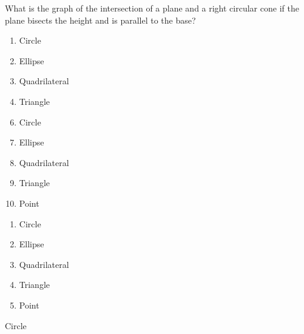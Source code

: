 





  What is the graph of the intersection of a plane and a right circular cone if the plane bisects the height and is parallel to the base? 


\ifsat
	\begin{enumerate}[label=\Alph*)]
		\item   Circle %
		\item  Ellipse
		\item  Quadrilateral 
		\item  Triangle
	\end{enumerate}
\else
\fi

\ifacteven
	\begin{enumerate}[label=\textbf{\Alph*.},itemsep=\fill,align=left]
		\setcounter{enumii}{5}
		\item   Circle %
		\item  Ellipse
		\item  Quadrilateral 
		\addtocounter{enumii}{1}
		\item  Triangle
		\item  Point
	\end{enumerate}
\else
\fi

\ifactodd
	\begin{enumerate}[label=\textbf{\Alph*.},itemsep=\fill,align=left]
		\item   Circle %
		\item  Ellipse
		\item  Quadrilateral 
		\item  Triangle
		\item  Point
	\end{enumerate}
\else
\fi

\ifgridin
   Circle %
		
\else
\fi

